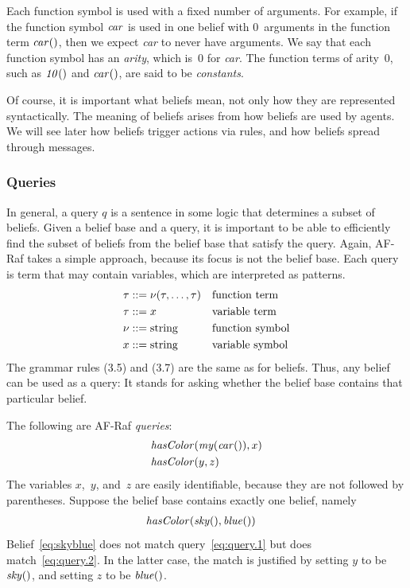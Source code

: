 \documentclass[a4paper,12pt,oneside,fleqn]{book} %
\begin{document}
Each function symbol is used with a fixed number of arguments.  For
example, if the function symbol ${\it car}$ is used in one belief with
$0$~arguments in the function term ${\it car}()$, then we expect {\it
car\/} to never have arguments.  We say that each function symbol has an
\emph{arity}, which is~$0$ for {\it car}.  The function terms of arity~$0$,
such as ${\it 10}()$ and ${\it car}()$, are said to be \emph{constants}.

\begin{remark}
Of course, it is important what beliefs mean, not only how they are
represented syntactically.  The meaning of beliefs arises from how beliefs
are used by agents.  We will see later how beliefs trigger actions via
rules, and how beliefs spread through messages.
\end{remark}

\subsubsection{Queries}

In general, a query $q$ is a sentence in some logic that determines a
subset of beliefs.  Given a belief base and a query, it is important to be
able to efficiently find the subset of beliefs from the belief base that
satisfy the query.  Again, AF-Raf takes a simple approach, because its
focus is not the belief base.  Each query is term that may contain
variables, which are interpreted as patterns.  \begin{align} \tau &::=
\nu(\tau,\ldots,\tau) && \text{function term} \\ \tau &::= x &&
\text{variable term} \\ \nu  &::= {\rm string} &&\text{function symbol} \\
x &::= {\rm string} && \text{variable symbol} \end{align} The grammar rules
(3.5) and (3.7) are the same as for beliefs.  Thus, any belief can be used as
a query:  It stands for asking whether the belief base contains that
particular belief.

\begin{example} The following are AF-Raf \emph{queries}: \begin{align}
&{\it hasColor}({\it my}({\it car}()), x) \label{eq:query.1} \\ &{\it
hasColor}(y, z) \label{eq:query.2} \end{align} The variables $x$,~$y$,
and~$z$ are easily identifiable, because they are not followed by
parentheses.  Suppose the belief base contains exactly one belief, namely
\begin{align} &{\it hasColor}({\it sky}(), {\it blue}()) \label{eq:skyblue}
\end{align} Belief~\eqref{eq:skyblue} does not match
query~\eqref{eq:query.1} but does match~\eqref{eq:query.2}.  In the latter
case, the match is justified by setting $y$ to be ${\it sky}()$, and
setting $z$ to be ${\it blue}()$.
\end{example}
\end{document}
